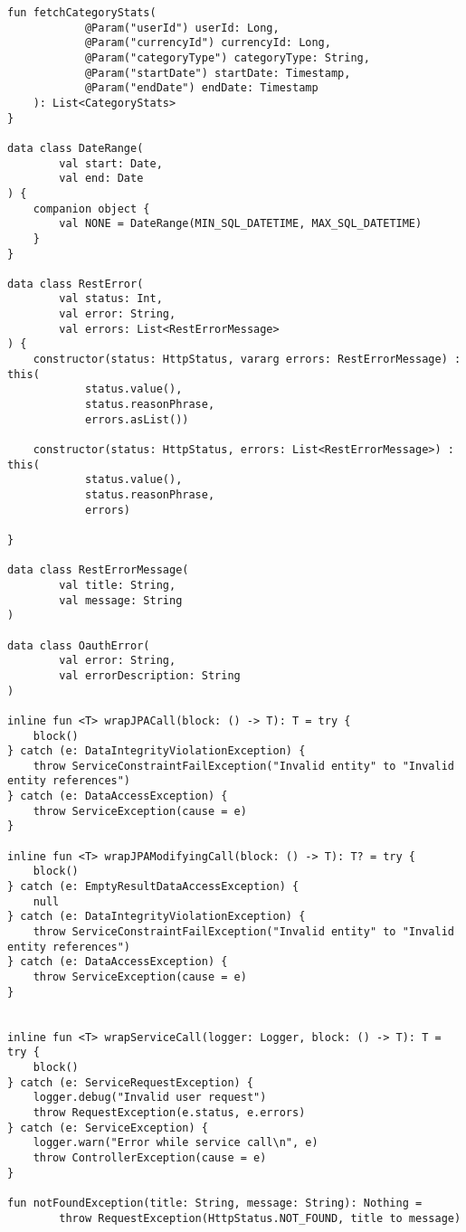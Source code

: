 \begin{lstlisting}[style = ktstyle]
    fun fetchCategoryStats(
            @Param("userId") userId: Long,
            @Param("currencyId") currencyId: Long,
            @Param("categoryType") categoryType: String,
            @Param("startDate") startDate: Timestamp,
            @Param("endDate") endDate: Timestamp
    ): List<CategoryStats>
}

data class DateRange(
        val start: Date,
        val end: Date
) {
    companion object {
        val NONE = DateRange(MIN_SQL_DATETIME, MAX_SQL_DATETIME)
    }
}

data class RestError(
        val status: Int,
        val error: String,
        val errors: List<RestErrorMessage>
) {
    constructor(status: HttpStatus, vararg errors: RestErrorMessage) : this(
            status.value(),
            status.reasonPhrase,
            errors.asList())

    constructor(status: HttpStatus, errors: List<RestErrorMessage>) : this(
            status.value(),
            status.reasonPhrase,
            errors)

}

data class RestErrorMessage(
        val title: String,
        val message: String
)

data class OauthError(
        val error: String,
        val errorDescription: String
)

inline fun <T> wrapJPACall(block: () -> T): T = try {
    block()
} catch (e: DataIntegrityViolationException) {
    throw ServiceConstraintFailException("Invalid entity" to "Invalid entity references")
} catch (e: DataAccessException) {
    throw ServiceException(cause = e)
}

inline fun <T> wrapJPAModifyingCall(block: () -> T): T? = try {
    block()
} catch (e: EmptyResultDataAccessException) {
    null
} catch (e: DataIntegrityViolationException) {
    throw ServiceConstraintFailException("Invalid entity" to "Invalid entity references")
} catch (e: DataAccessException) {
    throw ServiceException(cause = e)
}


inline fun <T> wrapServiceCall(logger: Logger, block: () -> T): T = try {
    block()
} catch (e: ServiceRequestException) {
    logger.debug("Invalid user request")
    throw RequestException(e.status, e.errors)
} catch (e: ServiceException) {
    logger.warn("Error while service call\n", e)
    throw ControllerException(cause = e)
}

fun notFoundException(title: String, message: String): Nothing =
        throw RequestException(HttpStatus.NOT_FOUND, title to message)


\end{lstlisting}
